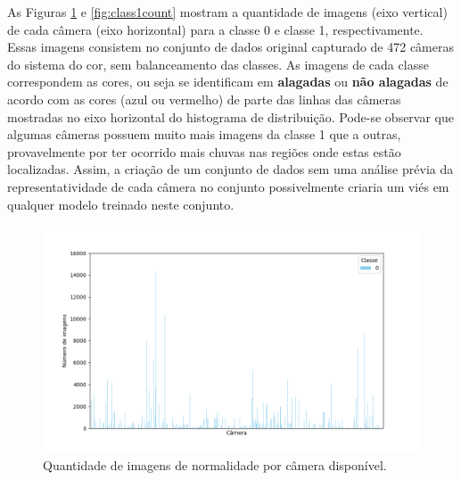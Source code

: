 As Figuras \ref{fig:class0count} e \ref{fig:class1count} mostram a quantidade de imagens (eixo vertical) de cada câmera (eixo horizontal) para a classe 0 e classe 1, respectivamente. 
Essas imagens consistem no conjunto de dados original capturado de 472 câmeras do sistema do \acrshort{cor}, sem balanceamento das classes. 
As imagens de cada classe correspondem as cores, ou seja se identificam em \textbf{alagadas} ou \textbf{não alagadas} de acordo com as cores (azul ou vermelho) de parte das linhas das câmeras mostradas no eixo horizontal do histograma de distribuição. 
Pode-se observar que algumas câmeras possuem muito mais imagens da classe 1 que a outras, provavelmente por ter ocorrido mais chuvas nas regiões onde estas estão localizadas. 
Assim, a criação de um conjunto de dados sem uma análise prévia da representatividade de cada câmera no conjunto possivelmente criaria um viés em qualquer modelo treinado neste conjunto.


\begin{figure}[htb]
    \centerline{\includegraphics[width=1\linewidth]{images/metodologia/class_0_count_code.png}}
    \caption{Quantidade de imagens de normalidade por câmera disponível.}
    \label{fig:class0count}
\end{figure}

